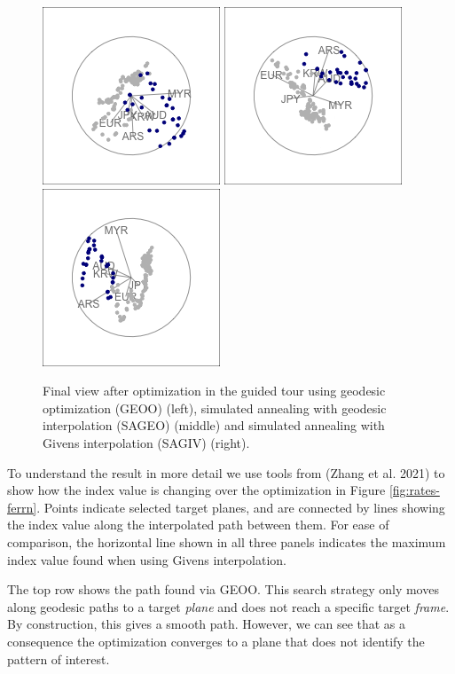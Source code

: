 \documentclass{article}
\begin{document}
\begin{figure}

{\centering \includegraphics[width=0.3\linewidth]{figures/rates_tour_geodesic_final} \includegraphics[width=0.3\linewidth]{figures/rates_tour_better_final} \includegraphics[width=0.3\linewidth]{figures/rates_tour_givens_final} 

}

\caption{Final view after optimization in the guided tour using geodesic optimization  (GEOO) (left), simulated annealing with geodesic interpolation (SAGEO) (middle) and simulated annealing with Givens interpolation (SAGIV) (right).}\label{fig:rates-tour-static}
\end{figure}

To understand the result in more detail we use tools from
 (Zhang et al. 2021) to show how the index value is
changing over the optimization in Figure \ref{fig:rates-ferrn}. Points
indicate selected target planes, and are connected by lines showing the
index value along the interpolated path between them. For ease of
comparison, the horizontal line shown in all three panels indicates the
maximum index value found when using Givens interpolation.

The top row shows the path found via GEOO. This search strategy only
moves along geodesic paths to a target \emph{plane} and does not reach a
specific target \emph{frame}. By construction, this gives a smooth path.
However, we can see that as a consequence the optimization converges to
a plane that does not identify the pattern of interest.
\end{document}
